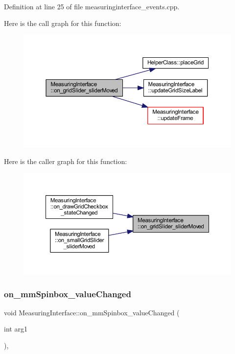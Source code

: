 Definition at line 25 of file measuringinterface\+\_\+events.\+cpp.

Here is the call graph for this function\+:
\nopagebreak
\begin{figure}[H]
\begin{center}
\leavevmode
\includegraphics[width=350pt]{classMeasuringInterface_a5f9322ce550b248eeac9cf9cd35b6400_cgraph}
\end{center}
\end{figure}
Here is the caller graph for this function\+:
\nopagebreak
\begin{figure}[H]
\begin{center}
\leavevmode
\includegraphics[width=350pt]{classMeasuringInterface_a5f9322ce550b248eeac9cf9cd35b6400_icgraph}
\end{center}
\end{figure}
\mbox{\label{classMeasuringInterface_ac94cdc4a4e60d0910c499b5ed496790a}} 
\subsubsection{\texorpdfstring{on\_mmSpinbox\_valueChanged}{on\_mmSpinbox\_valueChanged}}
{\footnotesize\ttfamily void Measuring\+Interface\+::on\+\_\+mm\+Spinbox\+\_\+value\+Changed (\begin{DoxyParamCaption}\item[{int}]{arg1 }\end{DoxyParamCaption})\hspace{0.3cm}{\ttfamily [private]}, {\ttfamily [slot]}}



